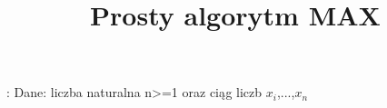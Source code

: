 \documentclass{article}
\title{Prosty algorytm MAX}
\begin{document}
: Dane: liczba naturalna n>=1 oraz ciąg liczb \(x_i\),...,\(x_n\)
\end{document}
